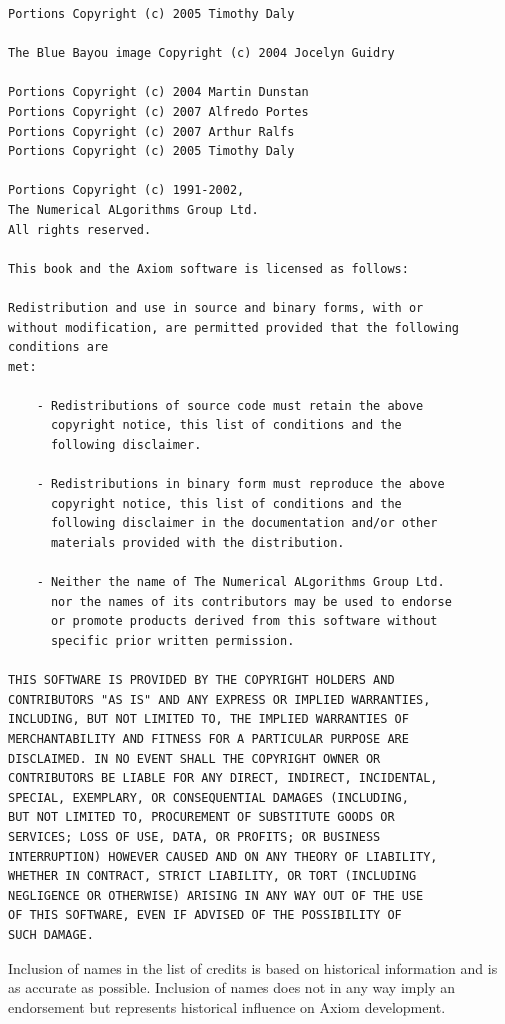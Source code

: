 \begin{verbatim}
Portions Copyright (c) 2005 Timothy Daly

The Blue Bayou image Copyright (c) 2004 Jocelyn Guidry

Portions Copyright (c) 2004 Martin Dunstan
Portions Copyright (c) 2007 Alfredo Portes
Portions Copyright (c) 2007 Arthur Ralfs
Portions Copyright (c) 2005 Timothy Daly

Portions Copyright (c) 1991-2002, 
The Numerical ALgorithms Group Ltd.
All rights reserved.

This book and the Axiom software is licensed as follows:

Redistribution and use in source and binary forms, with or 
without modification, are permitted provided that the following 
conditions are
met:

    - Redistributions of source code must retain the above 
      copyright notice, this list of conditions and the 
      following disclaimer.

    - Redistributions in binary form must reproduce the above
      copyright notice, this list of conditions and the 
      following disclaimer in the documentation and/or other 
      materials provided with the distribution.

    - Neither the name of The Numerical ALgorithms Group Ltd. 
      nor the names of its contributors may be used to endorse 
      or promote products derived from this software without 
      specific prior written permission.

THIS SOFTWARE IS PROVIDED BY THE COPYRIGHT HOLDERS AND 
CONTRIBUTORS "AS IS" AND ANY EXPRESS OR IMPLIED WARRANTIES, 
INCLUDING, BUT NOT LIMITED TO, THE IMPLIED WARRANTIES OF 
MERCHANTABILITY AND FITNESS FOR A PARTICULAR PURPOSE ARE 
DISCLAIMED. IN NO EVENT SHALL THE COPYRIGHT OWNER OR 
CONTRIBUTORS BE LIABLE FOR ANY DIRECT, INDIRECT, INCIDENTAL, 
SPECIAL, EXEMPLARY, OR CONSEQUENTIAL DAMAGES (INCLUDING, 
BUT NOT LIMITED TO, PROCUREMENT OF SUBSTITUTE GOODS OR 
SERVICES; LOSS OF USE, DATA, OR PROFITS; OR BUSINESS 
INTERRUPTION) HOWEVER CAUSED AND ON ANY THEORY OF LIABILITY, 
WHETHER IN CONTRACT, STRICT LIABILITY, OR TORT (INCLUDING
NEGLIGENCE OR OTHERWISE) ARISING IN ANY WAY OUT OF THE USE 
OF THIS SOFTWARE, EVEN IF ADVISED OF THE POSSIBILITY OF 
SUCH DAMAGE.

\end{verbatim}

\vfill
\newpage
Inclusion of names in the list of credits is based on historical
information and is as accurate as possible. Inclusion of names
does not in any way imply an endorsement but represents historical
influence on Axiom development.

